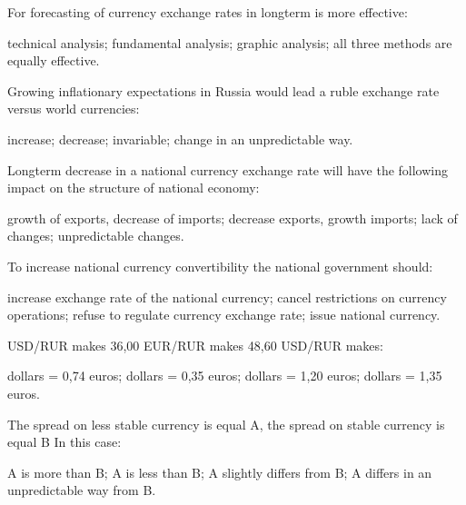 \documentclass[12pt, table]{exam}
\begin{document}
\begin{questions}
\begin{multicols}{2}
\question For forecasting of currency exchange rates in longterm is more effective:
	 \begin{choices}
	 \choice technical analysis;
	 \CC fundamental analysis;
	 \choice graphic analysis;
	 \choice all three methods are equally effective.
	 \end{choices}
\question Growing inflationary expectations in Russia would lead a ruble exchange rate versus world currencies:
	 \begin{choices}
	 \choice increase;
	 \CC decrease;
	 \choice invariable;
	 \choice change in an unpredictable way.
	 \end{choices}
\question Longterm decrease in a national currency exchange rate will have the following impact on the structure of national economy:
	 \begin{choices}
	 \CC growth of exports, decrease of imports;
	 \choice decrease exports, growth imports;
	 \choice lack of changes;
	 \choice unpredictable changes.
	 \end{choices}
\question To increase national currency convertibility the national government should:
	 \begin{choices}
	 \choice increase exchange rate of the national currency;
	 \CC cancel restrictions on currency operations;
	 \choice refuse to regulate currency exchange rate;
	 \choice issue national currency.
	 \end{choices}
\question USD/RUR makes 36,00 EUR/RUR makes 48,60 USD/RUR makes:
	 \begin{choices}
	  dollars = 0,74 euros;
	  dollars = 0,35 euros;
	  dollars = 1,20 euros;
	  dollars = 1,35 euros.
	 \end{choices}
\question The spread on less stable currency is equal A, the spread on stable currency is equal B In this case:
	 \begin{choices}
	 \CC A is more than B;
	 \choice A is less than B;
	 \choice A slightly differs from B;
	 \choice A differs in an unpredictable way from B.
	 \end{choices}



\end{multicols}
\end{questions}
\end{document}
